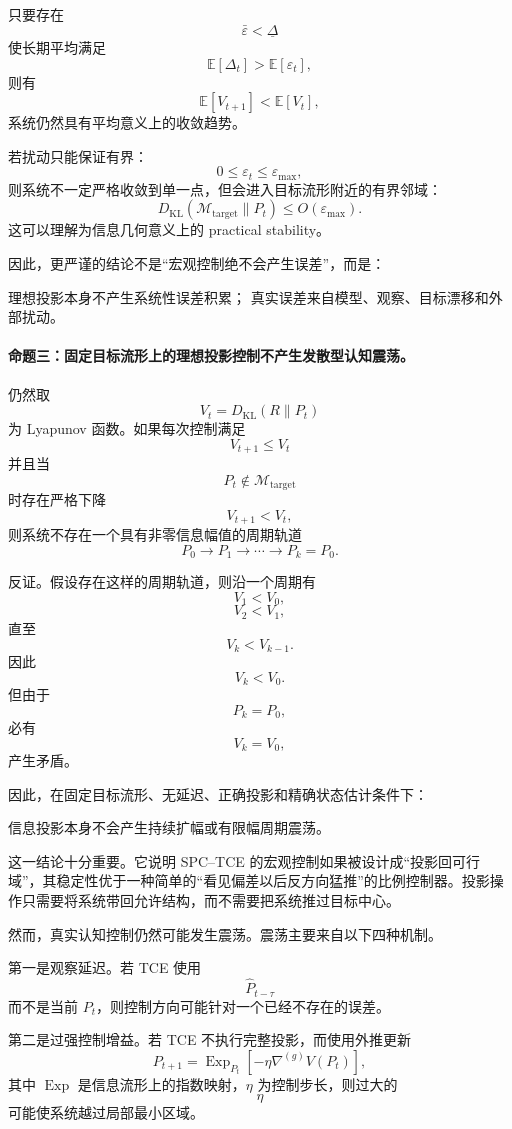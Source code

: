 只要存在
\[
\bar\varepsilon
<
\underline\Delta
\]
使长期平均满足
\[
\mathbb{E}[\Delta_t]
>
\mathbb{E}[\varepsilon_t],
\]
则有
\[
\mathbb{E}[V_{t+1}]
<
\mathbb{E}[V_t],
\]
系统仍然具有平均意义上的收敛趋势。

若扰动只能保证有界：
\[
0\le\varepsilon_t\le\varepsilon_{\max},
\]
则系统不一定严格收敛到单一点，但会进入目标流形附近的有界邻域：
\[
D_{\mathrm{KL}}
\left(
\mathcal{M}_{\mathrm{target}}\|P_t
\right)
\le
O(\varepsilon_{\max}).
\]
这可以理解为信息几何意义上的 practical stability。

因此，更严谨的结论不是``宏观控制绝不会产生误差''，而是：
\begin{conclusion}
理想投影本身不产生系统性误差积累；
真实误差来自模型、观察、目标漂移和外部扰动。
\end{conclusion}

\paragraph{命题三：固定目标流形上的理想投影控制不产生发散型认知震荡。}

仍然取
\[
V_t
=
D_{\mathrm{KL}}(R\|P_t)
\]
为 Lyapunov 函数。如果每次控制满足
\[
V_{t+1}\le V_t
\]
并且当
\[
P_t\notin\mathcal{M}_{\mathrm{target}}
\]
时存在严格下降
\[
V_{t+1}<V_t,
\]
则系统不存在一个具有非零信息幅值的周期轨道
\[
P_0
\rightarrow
P_1
\rightarrow
\cdots
\rightarrow
P_k
=
P_0.
\]

反证。假设存在这样的周期轨道，则沿一个周期有
\[
V_1<V_0,
\]
\[
V_2<V_1,
\]
直至
\[
V_k<V_{k-1}.
\]
因此
\[
V_k<V_0.
\]
但由于
\[
P_k=P_0,
\]
必有
\[
V_k=V_0,
\]
产生矛盾。

因此，在固定目标流形、无延迟、正确投影和精确状态估计条件下：
\begin{statementbox}
信息投影本身不会产生持续扩幅或有限幅周期震荡。
\end{statementbox}

这一结论十分重要。它说明 SPC--TCE 的宏观控制如果被设计成``投影回可行域''，其稳定性优于一种简单的``看见偏差以后反方向猛推''的比例控制器。投影操作只需要将系统带回允许结构，而不需要把系统推过目标中心。

然而，真实认知控制仍然可能发生震荡。震荡主要来自以下四种机制。

第一是观察延迟。若 TCE 使用
\[
\hat P_{t-\tau}
\]
而不是当前 $P_t$，则控制方向可能针对一个已经不存在的误差。

第二是过强控制增益。若 TCE 不执行完整投影，而使用外推更新
\[
P_{t+1}
=
\operatorname{Exp}_{P_t}
\left[
-\eta
\nabla^{(g)}
V(P_t)
\right],
\]
其中 $\operatorname{Exp}$ 是信息流形上的指数映射，$\eta$ 为控制步长，则过大的
\[
\eta
\]
可能使系统越过局部最小区域。

